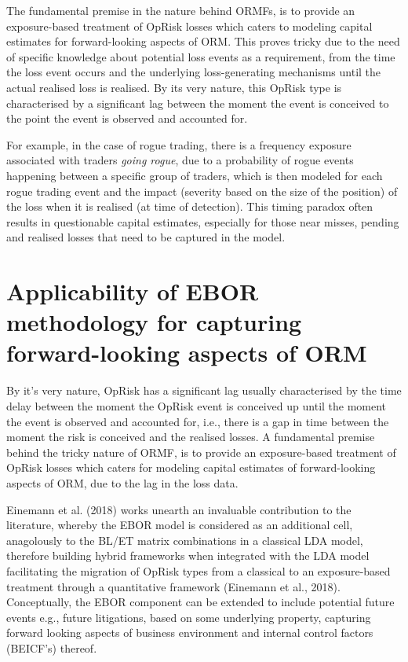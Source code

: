 \documentclass{DissertateUSU}
\begin{document}
The fundamental premise in the nature behind ORMFs, is to provide an
exposure-based treatment of OpRisk losses which caters to modeling
capital estimates for forward-looking aspects of ORM. This proves tricky
due to the need of specific knowledge about potential loss events as a
requirement, from the time the loss event occurs and the underlying
loss-generating mechanisms until the actual realised loss is realised.
By its very nature, this OpRisk type is characterised by a significant
lag between the moment the event is conceived to the point the event is
observed and accounted for.\medskip 

For example, in the case of rogue trading, there is a frequency exposure
associated with traders \emph{going rogue}, due to a probability of
rogue events happening between a specific group of traders, which is
then modeled for each rogue trading event and the impact (severity based
on the size of the position) of the loss when it is realised (at time of
detection). This timing paradox often results in questionable capital
estimates, especially for those near misses, pending and realised losses
that need to be captured in the model.

\section{Applicability of EBOR methodology for capturing forward-looking aspects of ORM}
\label{sec:Applicability of EBOR methodology for capturing forward-looking aspects of ORM}

By it's very nature, OpRisk has a significant lag usually characterised
by the time delay between the moment the OpRisk event is conceived up
until the moment the event is observed and accounted for, i.e., there is
a gap in time between the moment the risk is conceived and the realised
losses. A fundamental premise behind the tricky nature of ORMF, is to
provide an exposure-based treatment of OpRisk losses which caters for
modeling capital estimates of forward-looking aspects of ORM, due to the
lag in the loss data.\medskip

Einemann et al. (2018) works unearth an invaluable contribution to the
literature, whereby the EBOR model is considered as an additional cell,
anagolously to the BL/ET matrix combinations in a classical LDA model,
therefore building hybrid frameworks when integrated with the LDA model
facilitating the migration of OpRisk types from a classical to an
exposure-based treatment through a quantitative framework (Einemann et
al., 2018). Conceptually, the EBOR component can be extended to include
potential future events e.g., future litigations, based on some
underlying property, capturing forward looking aspects of business
environment and internal control factors (BEICF's) thereof.\medskip
\end{document}
